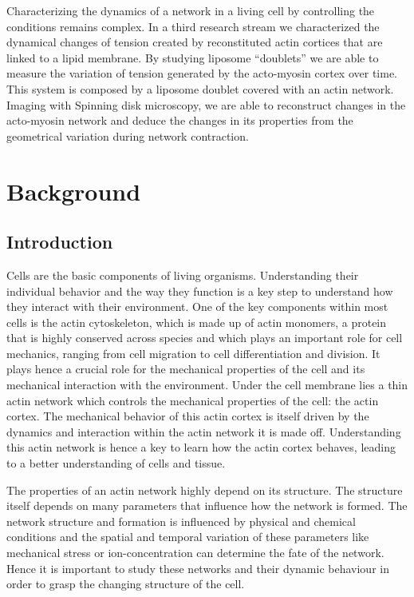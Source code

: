 \documentclass[A4paperpaper,11pt,english]{sphinxmanual}
\begin{document}
Characterizing the dynamics of a network in a living cell by controlling the
conditions remains complex.  In a third research stream we characterized the dynamical changes of tension created by reconstituted actin
cortices that are linked to a lipid
membrane. By studying liposome ``doublets'' we are able to measure the variation of tension generated by the acto-myosin cortex over
time. This system is composed by a liposome doublet covered with
an actin network. Imaging with Spinning disk microscopy, we are able to
reconstruct changes in the acto-myosin network and deduce the changes in its
properties from the geometrical variation during network contraction.


\chapter{Background}
\label{index-latex:background}

\section{Introduction}
\label{index-latex:introduction}
Cells are the basic components of living organisms. Understanding their
individual behavior and the way they function is a key step to understand
how they interact with their environment. One of the key components within most
cells is the actin cytoskeleton, which is made up of actin monomers, a protein that is highly conserved across species and which plays
an important role for cell mechanics, ranging from cell migration to cell differentiation
and division. It plays hence a crucial role for the mechanical properties of
the cell and its mechanical interaction with the environment. Under the cell membrane lies a
thin actin network which controls the mechanical properties of the cell:
the actin cortex. The mechanical behavior of this actin cortex is itself driven
by the dynamics and interaction within the actin network it is made off.
Understanding this actin network is hence a key to learn how the actin
cortex behaves, leading to a better understanding of cells and tissue.

The properties of an actin network highly depend on its structure. The
structure itself depends on many parameters that influence how the network is
formed.  The network structure and formation is influenced by physical and
chemical conditions and the spatial and temporal variation of these parameters like mechanical
stress or ion-concentration can determine the fate of the network. Hence it is
important to study these networks and their dynamic behaviour in order to grasp the
changing structure of the cell.
\end{document}
